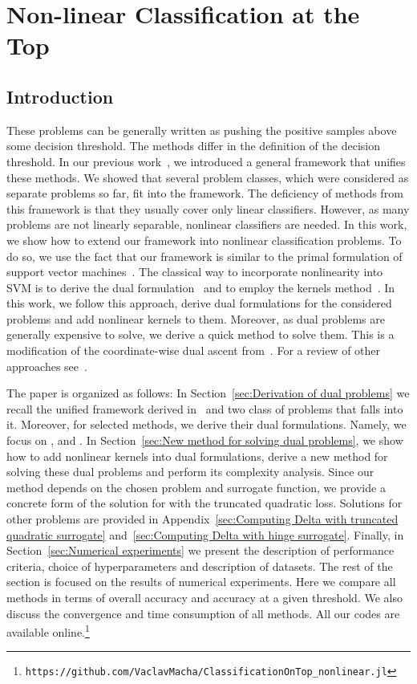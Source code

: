 \chapter{Non-linear Classification at the Top}\label{chap: dual}

\section{Introduction}

These problems can be generally written as pushing the positive samples above some decision threshold. The methods differ in the definition of the decision threshold. In our previous work~\cite{adam2021general}, we introduced a general framework that unifies these methods. We showed that several problem classes, which were considered as separate problems so far, fit into the framework. The deficiency of methods from this framework is that they usually cover only linear classifiers. However, as many problems are not linearly separable, nonlinear classifiers are needed. In this work, we show how to extend our framework into nonlinear classification problems. To do so, we use the fact that our framework is similar to the primal formulation of support vector machines~\cite{cortes1995support}. The classical way to incorporate nonlinearity into SVM is to derive the dual formulation~\cite{boyd2004convex} and to employ the kernels method~\cite{scholkopf2001learning}. In this work, we follow this approach, derive dual formulations for the considered problems and add nonlinear kernels to them. Moreover, as dual problems are generally expensive to solve, we derive a quick method to solve them. This is a modification of the coordinate-wise dual ascent from~\cite{hsieh2008dual}. For a review of other approaches see~\cite{batmaz2019review,werner2019review}.

The paper is organized as follows: In Section~\ref{sec:Derivation of dual problems} we recall the unified framework derived in~\cite{adam2021general} and two class of problems that falls into it. Moreover, for selected methods, we derive their dual formulations. Namely, we focus on \TopPush, \TopPushK and \PatMat. In Section~\ref{sec:New method for solving dual problems}, we show how to add nonlinear kernels into dual formulations, derive a new method for solving these dual problems and perform its complexity analysis. Since our method depends on the chosen problem and surrogate function, we provide a concrete form of the solution for \TopPushK with the truncated quadratic loss. Solutions for other problems are provided in Appendix~\ref{sec:Computing Delta with truncated quadratic surrogate} and~\ref{sec:Computing Delta with hinge surrogate}. Finally, in Section~\ref{sec:Numerical experiments} we present the description of performance criteria, choice of hyperparameters and description of datasets. The rest of the section is focused on the results of numerical experiments. Here we compare all methods in terms of overall accuracy and accuracy at a given threshold. We also discuss the convergence and time consumption of all methods. All our codes are available online.\footnote{\texttt{https://github.com/VaclavMacha/ClassificationOnTop\_nonlinear.jl}}

